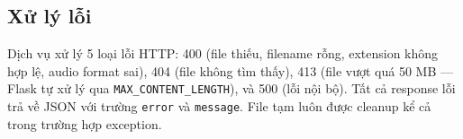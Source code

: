 {\subsection{Xử lý lỗi}

Dịch vụ xử lý 5 loại lỗi HTTP: 400 (file thiếu, filename rỗng, extension
không hợp lệ, audio format sai), 404 (file không tìm thấy), 413 (file
vượt quá 50 MB --- Flask tự xử lý qua \texttt{MAX\_CONTENT\_LENGTH}),
và 500 (lỗi nội bộ). Tất cả response lỗi trả về JSON với trường
\texttt{error} và \texttt{message}. File tạm luôn được cleanup kể cả
trong trường hợp exception.

}%
